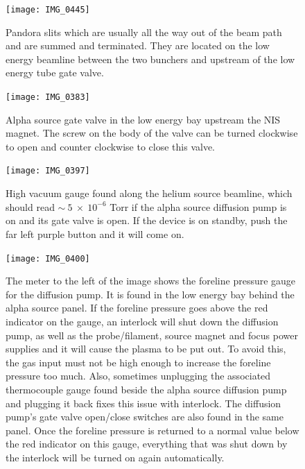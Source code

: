 \documentclass{article}
\begin{document}
\begin{figure}
\begin{center}
\texttt{[image: IMG\_0445]}\\
\end{center}
\caption{\label{figure5}Pandora slits which are usually all the way out of the beam path and are summed and terminated. They are located on the low energy beamline between the two bunchers and upstream of the low energy tube gate valve.}
\end{figure}

\begin{figure}
\begin{center}
\texttt{[image: IMG\_0383]}\\
\end{center}
\caption{\label{figure6}Alpha source gate valve in the low energy bay upstream the NIS magnet. The screw on the body of the valve can be turned clockwise to open and counter clockwise to close this valve.}
\end{figure}

\begin{figure}
\begin{center}
\texttt{[image: IMG\_0397]}\\
\end{center}
\caption{\label{figure7}High vacuum gauge found along the helium source beamline, which should read $\sim~5~\times~10^{-6}$ Torr if the alpha source diffusion pump is on and its gate valve is open. If the device is on standby, push the far left purple button and it will come on.}
\end{figure}

\begin{figure}
\begin{center}
\texttt{[image: IMG\_0400]}\\
\end{center}
\caption{\label{figure8}The meter to the left of the image shows the foreline pressure gauge for the diffusion pump. It is found in the low energy bay behind the alpha source panel. If the foreline pressure goes above the red indicator on the gauge, an interlock will shut down the diffusion pump, as well as the probe/filament, source magnet and focus power supplies and it will cause the plasma to be put out. To avoid this, the gas input must not be high enough to increase the foreline pressure too much. Also, sometimes unplugging the associated thermocouple gauge found beside the alpha source diffusion pump and plugging it back fixes this issue with interlock. The diffusion pump's gate valve open/close switches are also found in the same panel. Once the foreline pressure is returned to a normal value below the red indicator on this gauge, everything that was shut down by the interlock will be turned on again automatically.}
\end{figure}
\end{document}
